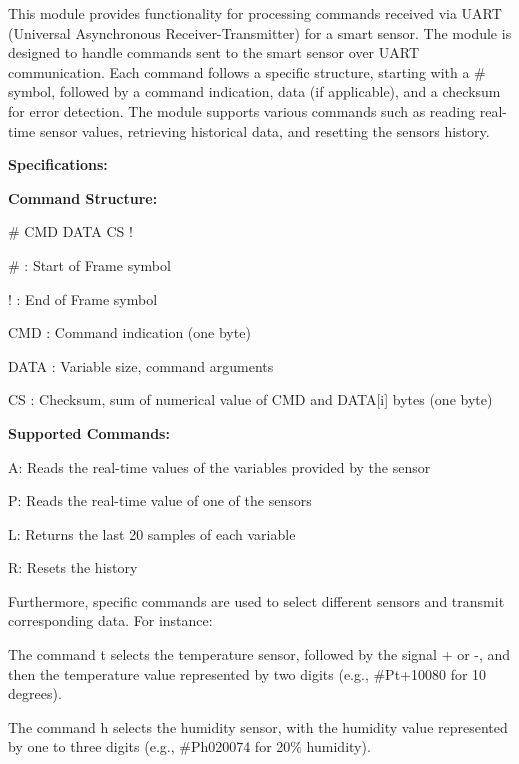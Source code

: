 This module provides functionality for processing commands received via UART (Universal Asynchronous Receiver-\/\+Transmitter) for a smart sensor. The module is designed to handle commands sent to the smart sensor over UART communication. Each command follows a specific structure, starting with a \textquotesingle{}\#\textquotesingle{} symbol, followed by a command indication, data (if applicable), and a checksum for error detection. The module supports various commands such as reading real-\/time sensor values, retrieving historical data, and resetting the sensor\textquotesingle{}s history.

{\bfseries{Specifications\+:}}
\begin{DoxyItemize}
\item {\bfseries{Command Structure\+:}}
\begin{DoxyItemize}
\item \textquotesingle{}\#\textquotesingle{} CMD DATA CS \textquotesingle{}!\textquotesingle{}
\item \# \+: Start of Frame symbol
\item ! \+: End of Frame symbol
\item CMD \+: Command indication (one byte)
\item DATA \+: Variable size, command arguments
\item CS \+: Checksum, sum of numerical value of CMD and DATA\mbox{[}i\mbox{]} bytes (one byte)
\end{DoxyItemize}
\item {\bfseries{Supported Commands\+:}}
\begin{DoxyItemize}
\item A\+: Reads the real-\/time values of the variables provided by the sensor
\item P\+: Reads the real-\/time value of one of the sensors
\item L\+: Returns the last 20 samples of each variable
\item R\+: Resets the history
\end{DoxyItemize}
\item Furthermore, specific commands are used to select different sensors and transmit corresponding data. For instance\+:
\begin{DoxyItemize}
\item The command \textquotesingle{}t\textquotesingle{} selects the temperature sensor, followed by the signal + or -\/, and then the temperature value represented by two digits (e.\+g., \#\+Pt+10080 for 10 degrees).
\item The command \textquotesingle{}h\textquotesingle{} selects the humidity sensor, with the humidity value represented by one to three digits (e.\+g., \#\+Ph020074 for 20\% humidity).

\end{DoxyItemize}
\end{DoxyItemize}
